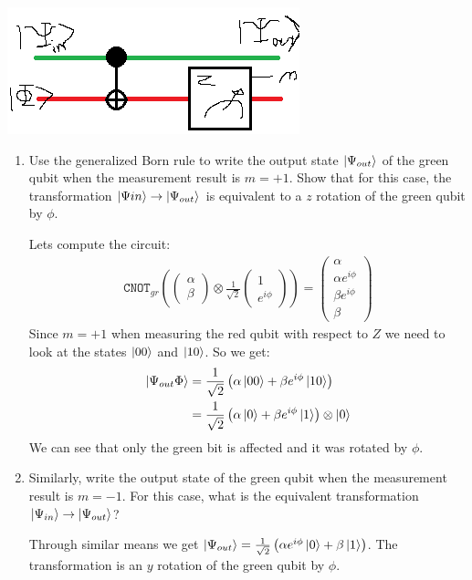\documentclass[12pt]{article}
\newcommand{\pmat}[1]{\begin{pmatrix}#1\end{pmatrix}}
\newcommand{\rsqrt}[1]{\ensuremath{\frac{1}{\sqrt{#1}}}}
\newenvironment{answer}{\begingroup\setlength{\leftskip}{-\leftmargin}\begin{framed}}{\end{framed}\endgroup}
\newcommand{\CNOT}[1]{\ensuremath{\texttt{CNOT}_{#1}}}
\begin{document}
\centering\includegraphics{problem6.png}

\begin{enumerate}
    \item Use the generalized Born rule to write the output state $\ket{\Psi_{out}}$ of the green qubit when the measurement result is $m = +1$. Show that for this case, the transformation $\ket{\Psi{in}} \rightarrow \ket{\Psi_{out}}$ is equivalent to a $z$ rotation of the green qubit by $\phi$.

    \begin{answer}
        Lets compute the circuit:
        \begin{align*}
            \CNOT{gr}(\pmat{\alpha \\ \beta} \otimes \rsqrt{2}\pmat{1 \\ e^{i\phi}}) = \pmat{ \alpha \\ \alpha{}e^{i\phi} \\ \beta{}e^{i\phi} \\ \beta }
        \end{align*}
        Since $m = +1$ when measuring the red qubit with respect to $Z$ we need to look at the states $\ket{00}$ and $\ket{10}$. So we get:
        \begin{align*}
            \ket{\Psi_{out}\Phi} &= \rsqrt{2}\left(\alpha\ket{00} + \beta{}e^{i\phi}\ket{10}\right) \\
                &= \rsqrt{2}\left(\alpha\ket{0} + \beta{}e^{i\phi}\ket{1}\right) \otimes \ket{0}
        \end{align*}
        We can see that only the green bit is affected and it was rotated by $\phi$.
    \end{answer}

    \item Similarly, write the output state of the green qubit when the measurement result is $m = -1$. For this case, what is the equivalent transformation $\ket{\Psi_{in}} \rightarrow \ket{\Psi_{out}}$?

    \begin{answer}
        Through similar means we get $\ket{\Psi_{out}} = \rsqrt{2}\left(\alpha{}e^{i\phi}\ket{0} + \beta\ket{1}\right)$. The transformation is an $y$ rotation of the green qubit by $\phi$.
    \end{answer}
\end{enumerate}
\end{document}
